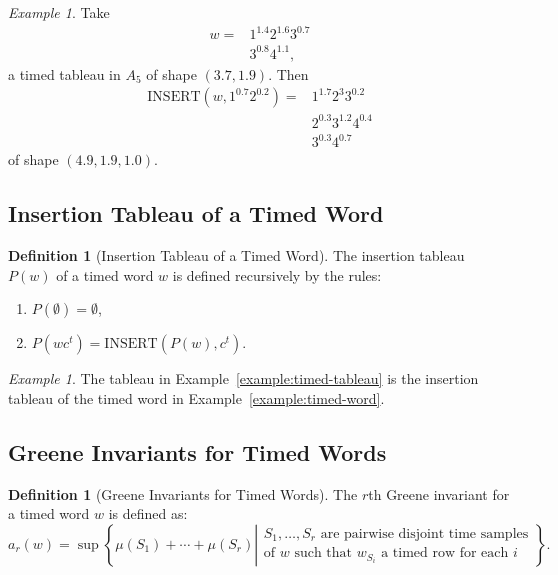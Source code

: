 \documentclass[10pt]{amsproc}
\theoremstyle{definition}
\newtheorem{definition}[theorem]{Definition}
\theoremstyle{remark}
\newtheorem{example}[theorem]{Example}
\newcommand{\ins}{\mathrm{INSERT}}
\begin{document}
\begin{example}
  Take
  \begin{align*}
    w = & 1^{1.4}2^{1.6}3^{0.7}\\
    & 3^{0.8}4^{1.1},
  \end{align*}
  a timed tableau in $A_5$ of shape $(3.7,1.9)$.
  Then
  \begin{align*}
    \ins(w,1^{0.7}2^{0.2})=& 1^{1.7}2^{3}3^{0.2}\\
    & 2^{0.3}3^{1.2}4^{0.4}\\
    & 3^{0.3}4^{0.7}
  \end{align*}
  of shape $(4.9,1.9,1.0)$.
\end{example}
\subsection{Insertion Tableau of a Timed Word}
\label{sec:insertion-tableau}
\begin{definition}
  [Insertion Tableau of a Timed Word]
  The insertion tableau $P(w)$ of a timed word $w$ is defined recursively by the rules:
  \begin{enumerate}
  \item $P(\emptyset) = \emptyset$,
  \item $P(wc^t) = \ins(P(w),c^t)$.
  \end{enumerate}
\end{definition}
\begin{example}
  The tableau in Example~\ref{example:timed-tableau} is the insertion tableau of the timed word in Example~\ref{example:timed-word}.
\end{example}
\subsection{Greene Invariants for Timed Words}
\label{sec:greene-invar-timed}
\begin{definition}
  [Greene Invariants for Timed Words]
  The $r$th Greene invariant for a timed word $w$ is defined as:
  \begin{displaymath}
    a_r(w) = \sup\left\{\mu(S_1)+\dotsb + \mu(S_r)\left|
      \begin{array}{cc}
        S_1,\dotsc, S_r \text{ are pairwise disjoint time samples}\\
        \text{of $w$ such that $w_{S_i}$ a timed row for each $i$}
      \end{array}
      \right.
    \right\}.
  \end{displaymath}
\end{definition}
\end{document}
